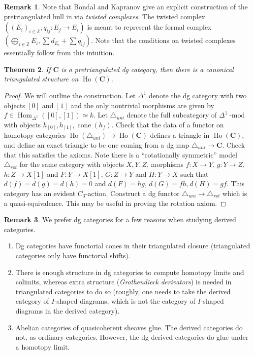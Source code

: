 \documentclass[10pt]{article}
\newtheorem{thm}{Theorem}[section]
\theoremstyle{definition}
\newtheorem{rmk}[thm]{Remark}
\DeclareMathOperator{\Hom}{Hom}
\DeclareMathOperator{\dmod}{-mod}
\DeclareMathOperator{\Ho}{Ho}
\DeclareMathOperator{\cone}{cone}
\newcommand{\cat}{\mathbf}
\newcommand{\Z}{\mathbb{Z}}
\begin{document}
\begin{rmk}
Note that Bondal and Kapranov give an explicit construction of the pretriangulated hull in \cite{BK} via \emph{twisted complexes}.  The twisted complex $((E_i)_{i \in \Z}, q_{ij}: E_j \rightarrow E_i)$ is meant to represent the formal complex $(\bigoplus_{i \in \Z} E_i, \sum d_{E_i} + \sum q_{ij})$.  Note that the conditions on twisted complexes essentially follow from this intuition.
\end{rmk}

\begin{thm}
If $\cat{C}$ is a pretriangulated dg category, then there is a canonical triangulated structure on $\Ho(\cat{C})$.
\end{thm}
\begin{proof}
We will outline the construction.  Let $\Delta^1$ denote the dg category with two objects $[0]$ and $[1]$ and the only nontrivial morphisms are given by $f \in \Hom_{\Delta^1}([0], [1]) \simeq k$.  Let $\triangle_{uni}$ denote the full subcategory of $\Delta^1\dmod$ with objects $h_{[0]}, h_{[1]}, \cone(h_f)$.  Check that the data of a functor on homotopy categories $\Ho(\triangle_{uni}) \rightarrow \Ho(\cat{C})$ defines a triangle in $\Ho(\cat{C})$, and define an exact triangle to be one coming from a dg map $\triangle_{uni} \rightarrow \cat{C}$.  Check that this satisfies the axioms.  Note there is a ``rotationally symmetric'' model $\triangle_{rot}$ for the same category with objects $X, Y, Z$, morphisms $f: X \rightarrow Y$, $g: Y \rightarrow Z$, $h: Z \rightarrow X[1]$ and $F: Y \rightarrow X[1]$, $G: Z \rightarrow Y$ and $H: Y \rightarrow X$ such that $d(f) = d(g) = d(h) = 0$ and $d(F) = hg$, $d(G) =fh, d(H)= gf$.  This category has an evident $C_3$-action.  Construct a dg functor $\triangle_{uni} \rightarrow \triangle_{rot}$ which is a quasi-equivalence.  This may be useful in proving the rotation axiom.
\end{proof}


\begin{rmk}
We prefer dg categories for a few reasons when studying derived categories.
\begin{enumerate}
\item Dg categories have functorial cones in their triangulated closure (triangulated categories only have functorial shifts).
\item There is enough structure in dg categories to compute homotopy limits and colimits, whereas extra structure (\emph{Grothendieck derivators}) is needed in triangulated categories to do so (roughly, one needs to take the derived category of $I$-shaped diagrams, which is not the category of $I$-shaped diagrams in the derived category).
\item Abelian categories of quasicoherent sheaves glue.  The derived categories do not, as ordinary categories.  However, the dg derived categories do glue under a homotopy limit.
\end{enumerate}
\end{rmk}
\end{document}

